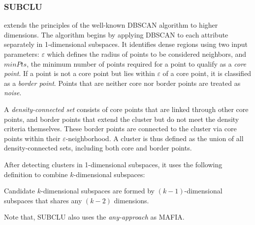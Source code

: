 \subsubsection{SUBCLU}
extends the principles of the well-known DBSCAN algorithm \cite{dbscan} to higher dimensions. The algorithm begins by applying DBSCAN to each attribute separately in 1-dimensional subspaces. It identifies dense regions using two input parameters: $\varepsilon$ which defines the radius of points to be considered neighbors, and $minPts$, the minimum number of points required for a point to qualify as a \textit{core point}. If a point is not a core point but lies within $\varepsilon$ of a core point, it is classified as a \textit{border point}. Points that are neither core nor border points are treated as \textit{noise}.

A \textit{density-connected set} consists of core points that are linked through other core points, and border points that extend the cluster but do not meet the density criteria themselves. These border points are connected to the cluster via core points within their $\varepsilon$-neighborhood. A cluster is thus defined as the union of all density-connected sets, including both core and border points.

After detecting clusters in 1-dimensional subspaces, it uses the following definition to combine $k$-dimensional subspaces:
\begin{definition}
    Candidate $k$-dimensional subspaces are formed by $(k-1)$-dimensional subspaces that shares any $(k-2)$ dimensions.
\end{definition}
Note that, SUBCLU also uses the \textit{any-approach} as MAFIA.

